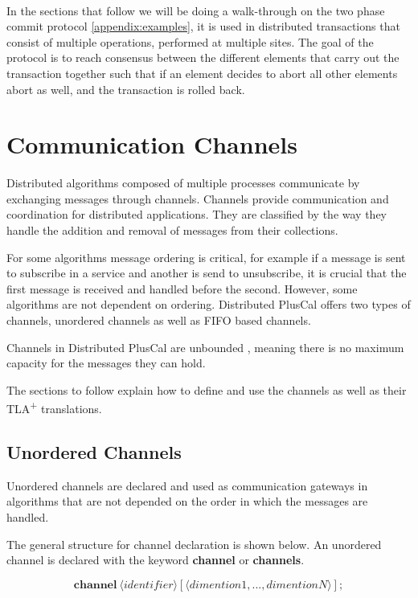 \documentclass{thesul}
\newcommand{\tlaplus}{TLA\textsuperscript{+}\xspace}
\newcommand{\keyword}[1]{\textbf{#1}}
\newcommand{\entity}[1]{\ensuremath{\langle}#1\ensuremath{\rangle}}
\begin{document}
\hfill\\
In the sections that follow we will be doing a walk-through on the two phase commit protocol \ref{appendix:examples}, it is used in distributed transactions that consist of multiple operations, performed at multiple sites. The goal of the protocol is to reach consensus between the different elements that carry out the transaction together such that if an element decides to abort all other elements abort as well, and the transaction is rolled back.

\FloatBarrier
\section{Communication Channels}
\label{comChannels}

Distributed algorithms composed of multiple processes communicate by exchanging messages through channels. Channels provide communication and coordination for distributed applications. They are classified by the way they handle the addition and removal of messages from their collections. 

For some algorithms message ordering is critical, for example if a message is sent to subscribe in a service and another is send to unsubscribe, it is crucial that the first message is received and handled before the second. However, some algorithms are not dependent on ordering. Distributed PlusCal offers two types of channels, unordered channels as well as FIFO based channels.

Channels in Distributed PlusCal are unbounded , meaning there is no maximum capacity for the messages they can hold.

The sections to follow explain how to define and use the channels as well as their \tlaplus translations. 

\subsection{Unordered Channels}

Unordered channels are declared and used as communication gateways in algorithms that are not depended on the order in which the messages are handled.

The general structure for channel declaration is shown below. An unordered channel is declared with the keyword \keyword{channel} or \keyword{channels}. 

\[
 \keyword{channel}\ \entity{identifier}[\entity{dimention1,...,dimentionN}];
\]
\end{document}
